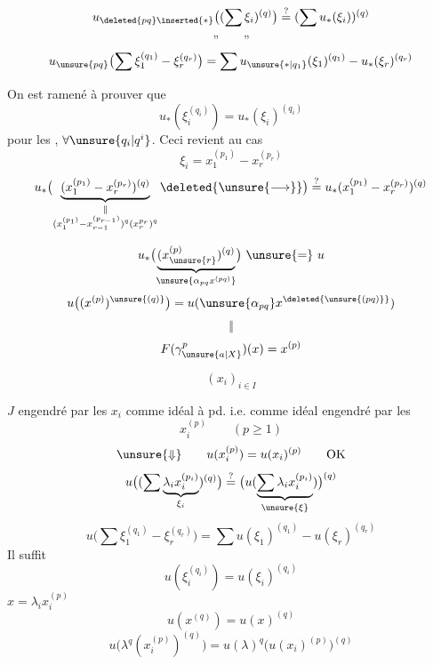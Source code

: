 
\[
u_{\deleted{pq}\inserted{*}}\bigl((\sum\xi_i)^{(q)}\bigr)
\overset{?}{=}(\sum u_*(\xi_i))^{(q)}
\]
\[\text{''}\qquad\text{''}\]
\[
u_{\unsure{pq}}\bigl(\sum\xi_1^{(q_1)}-\xi_r^{(q_r)}\bigr)
=\sum u_{\unsure{*|q_1}}(\xi_1)^{(q_1)}-u_*(\xi_r)^{(q_r)}
\]

On est ramené à prouver que
\[
u_*(\xi_i^{(q_i)})=u_*(\xi_i)^{(q_i)}
\]
pour les , $\forall\unsure{q_i|q^i}$.
Ceci revient au cas
\[
\xi_i=x_1^{(p_1)}-x_r^{(p_r)}
\]
\[
u_*\bigl(\underbrace{(x_1^{(p_1)}-x_r^{(p_r)})^{(q)}}_{\substack{\Vert\\(x_1^{(p_1)}-x_{r-1}^{(p_{r-1})})^q(x_r^{p_r})^q}}\deleted{\unsure{\longrightarrow}}\bigr)
\overset{?}{=}u_*(x_1^{(p_1)}-x_r^{(p_r)})^{(q)}
\]

\[
u_*\bigl(\underbrace{(x_{\unsure{r}}^{(p)})^{(q)}}_{\unsure{\alpha_{pq}x^{(pq)}}}\bigr)\ \unsure{=}\ u
\]
\[
u\bigl((x^{(p)})^{\unsure{(q)}}\bigr)
=u(\unsure{\alpha_{pq}}x^{\deleted{\unsure{(pq)}}})
\]
\[\Vert\]
\[
F(\gamma_{\unsure{a|X}}^p)(x)=x^{(p)}
\]

\[(x_i)_{i\in I}\]

$J$ engendré par les $x_i$ comme idéal à pd.
i.e. comme idéal engendré par les
\[
x_i^{(p)}\qquad(p\geq1)
\]
\[
\unsure{\Downarrow}\qquad u(x_i^{(p)})=u(x_i)^{(p)}\qquad\mathrm{OK}
\]
\[
u\bigl((\sum\underbrace{\lambda_i x_i^{(p_i)}}_{\xi_i})^{(q)}\bigr)
\overset{?}{=}\bigl(u(\underbrace{\sum\lambda_i x_i^{(p_i)}}_{\unsure{\xi}})\bigr)^{(q)}
\]
\[
u\bigl(\sum\xi_1^{(q_1)}-\xi_r^{(q_r)}\bigr)
=\sum u(\xi_1)^{(q_1)}-u(\xi_r)^{(q_r)}
\]
Il suffit
\[
u(\xi_i^{(q_i)})=u(\xi_i)^{(q_i)}
\]
\quad $x=\lambda_i x_i^{(p)}$
\[
u(x^{(q)})=u(x)^{(q)}
\]
\[
u\bigl(\lambda^q(x_i^{(p)})^{(q)}\bigr)
=u(\lambda)^q\bigl(u(x_i)^{(p)}\bigr)^{(q)}
\]

